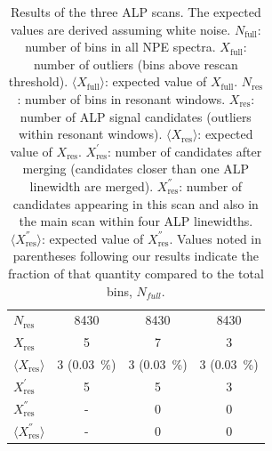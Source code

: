 \documentclass[superscriptaddress,
floatfix,
reprint,
nofootinbib,
amsmath,amssymb,
aps,
prd,
]{revtex4-2}
\begin{document}
\begin{table}[htb]
\begin{ruledtabular}
\begin{tabular}{lccc}
\hline 
$N_\mathrm{res}$ & \SI{8430}{} & \SI{8430}{} & \SI{8430}{} \\
$X_\mathrm{res}$ & 5 & 7 & 3 \\
$\langle X_\mathrm{res}\rangle$ & 3 (\SI{0.03}{\%}) & 3 (\SI{0.03}{\%}) & 3 (\SI{0.03}{\%})\\
$X^{'}_\mathrm{res}$ & 5 & 5 & 3 \\
$X^{''}_\mathrm{res}$ & - & 0 & 0 \\
$\langle X^{''}_\mathrm{res}\rangle$ & - & 0 & 0 \\
\end{tabular}
\end{ruledtabular}
\caption{
Results of the three ALP scans. 
The expected values are derived assuming white noise. 
$N_\mathrm{full}$: number of bins in all NPE spectra.
$X_\mathrm{full}$: number of outliers (bins above rescan threshold). 
$\langle X_\mathrm{full} \rangle$: expected value of $X_\mathrm{full}$. 
$N_\mathrm{res}$: number of bins in resonant windows.
$X_\mathrm{res}$: number of ALP signal candidates (outliers within resonant windows). 
$\langle X_\mathrm{res} \rangle$: expected value of $X_\mathrm{res}$. 
$X^{'}_\mathrm{res}$: number of candidates after merging (candidates closer than one ALP linewidth are merged). 
$X^{''}_\mathrm{res}$: number of candidates appearing in this scan and also in the main scan within four ALP linewidths. 
$\langle X^{''}_\mathrm{res}\rangle$: expected value of $X^{''}_\mathrm{res}$. 
Values noted in parentheses following our results indicate the fraction of that quantity compared to the total bins, $N_{full}$.
}
\label{tab:candidates}
\end{table}
\end{document}

